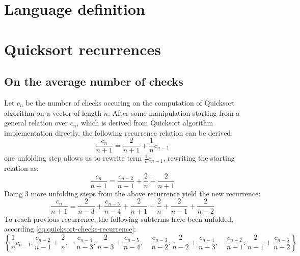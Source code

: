 \documentclass[a4paper,dottedtoc,headinclude,footinclude]{report} %
\theoremstyle{plain}
\begin{document}
    \tableofcontents
    
    \chapter{Language definition}
    \lipsum[1]

    \chapter{Quicksort recurrences}

    \section{On the average number of checks}

    Let $c_{n}$ be the number of checks occuring on the computation
    of Quicksort algorithm on a vector of length $n$. After some manipulation
    starting from a general relation over $c_{n}$, which is derived from
    Quicksort algorithm implementation directly, the following
    recurrence relation can be derived:
    \begin{equation}
        \label{eq:quicksort-checks-recurrence}
        \frac{c_{n}}{n + 1} = \frac{2}{n + 1} + \frac{1}{n} c_{n - 1}
    \end{equation}
    one unfolding step allows us to rewrite term $\frac{1}{n} c_{n - 1}$, 
    rewriting the starting relation as:
    \begin{displaymath}
        \frac{c_{n}}{n + 1} = \frac{c_{n - 2}}{n - 1} + \frac{2}{n} + \frac{2}{n + 1}
    \end{displaymath}
    Doing $3$ more unfolding steps from the above recurrence yield the
    new recurrence:
    \begin{displaymath}
        \frac{c_{n}}{n + 1} = \frac{2}{n - 3} + \frac{c_{n - 5}}{n - 4} + \frac{2}{n + 1} + \frac{2}{n} + \frac{2}{n - 1} + \frac{2}{n - 2}
    \end{displaymath}
    To reach previous recurrence, the following subterms have been unfolded,
    according \autoref{eq:quicksort-checks-recurrence}:
    \begin{displaymath}
        \left \{ \frac{1}{n} c_{n - 1} : \frac{c_{n - 2}}{n - 1} + \frac{2}{n}, \quad \frac{c_{n - 4}}{n - 3} : \frac{2}{n - 3} + \frac{c_{n - 5}}{n - 4}, \quad \frac{c_{n - 3}}{n - 2} : \frac{2}{n - 2} + \frac{c_{n - 4}}{n - 3}, \quad \frac{c_{n - 2}}{n - 1} : \frac{2}{n - 1} + \frac{c_{n - 3}}{n - 2}\right \}
    \end{displaymath}
\end{document}
